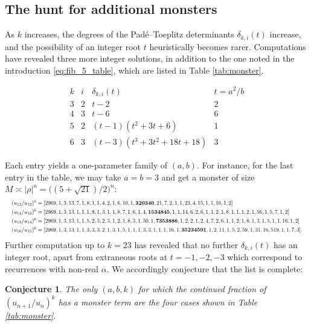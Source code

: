 \documentclass{article}
\numberwithin{equation}{section}
\newtheorem{conj}[thm]{Conjecture}
\theoremstyle{definition}
\theoremstyle{remark}
\newcommand{\<}{\left\langle}
\renewcommand{\>}{\right\rangle}
\begin{document}
\subsection{The hunt for additional monsters}

As $k$ increases, the degrees of the Pad\'e--Toeplitz determinants
$\delta_{k,i}(t)$ increase, and the possibility of an integer root $t$ heuristically becomes rarer. Computations have revealed three more integer solutions, in addition
to the one noted in the introduction \eqref{eq:fib_5_table}, which are listed
in Table \ref{tab:monster}.

\begin{table}[ht]
  \begin{equation*}
    \begin{array}{c|c|c|c}
      k&i&\delta_{k,i}(t)&t=a^2/b\\
      \hline
      3&2&t-2&2\\
      4&3&t-6&6\\
      5&2&(t-1)(t^2+3t+6)&1\\
      6&3&(t-3)(t^3+3t^2+18t+18)&3
    \end{array}
  \end{equation*}
  \caption{The four known cases in which $(u_{n+1}/u_n)^k$ displays a monster term}
  \label{tab:monster}
\end{table}

Each entry yields a one-parameter family of $(a,b)$. For instance, for the last entry in the table, we may take $a=b=3$ and get a monster of size $M\asymp |\rho|^n = \big((5+\sqrt{21})/2\big)^n$:
\begin{equation*}
  \resizebox{\textwidth}{!}{$\displaystyle\begin{aligned}
    (u_{13}/u_{12})^6 &= [2969,1,3,13,7,1,8,1,1,4,2,1,6,10,1,\mathbf{320340},21,7,2,1,1,23,4,15,1,1,16,1,2] \\
    (u_{14}/u_{13})^6 &= [2969,1,3,13,1,1,1,9,1,3,1,1,8,7,1,6,1,4,\mathbf{1534845},1,1,14,6,2,6,1,1,2,1,8,1,1,1,2,1,56,1,5,7,1,2] \\
    (u_{15}/u_{14})^6 &= [2969,1,3,13,1,1,5,2,3,2,3,1,2,1,8,3,1,30,1,\mathbf{7353886},1,2,2,1,2,4,7,2,6,1,1,2,1,8,1,3,1,5,1,1,16,1,2] \\
    (u_{16}/u_{15})^6 &= [2969,1,3,13,1,1,3,3,3,2,1,3,1,5,1,1,1,3,3,1,1,1,16,1,\mathbf{35234591},1,2,11,1,5,2,59,1,31,16,519,1,1,7,3].
  \end{aligned}$}
\end{equation*}
Further computation up to $k = 23$ has revealed that no further $\delta_{k,i}(t)$ has an integer root, apart from extraneous roots at $t = -1,-2,-3$ which correspond to recurrences with non-real $\alpha$. We accordingly conjecture that the list is complete:
\begin{conj}
  The only $(a,b,k)$ for which the continued fraction of $(u_{n+1}/u_n)^k$ has a monster term are the four cases shown in Table \ref{tab:monster}.
\end{conj}
\end{document}
